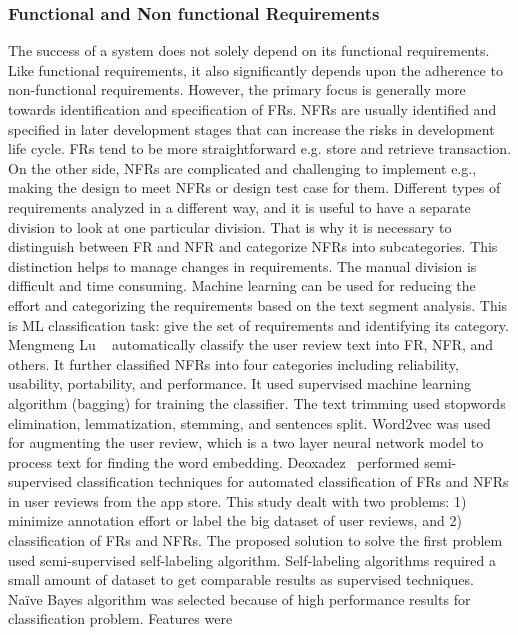 \subsubsection{Functional and Non functional Requirements}
The success of a system does not solely depend on its functional requirements.
Like functional requirements, it also significantly depends upon the adherence
to non-functional requirements. However, the primary focus is generally more
towards identification and specification of FRs. NFRs are usually identified and
specified in later development stages that can increase the risks in development
life cycle. FRs tend to be more straightforward e.g. store and retrieve
transaction. On the other side, NFRs are complicated and challenging to
implement e.g., making the design to meet NFRs or design test case for them.
Different types of requirements analyzed in a different way, and it is useful to
have a separate division to look at one particular division. That is why it is
necessary to distinguish between FR and NFR and categorize NFRs into
subcategories. This distinction helps to manage changes in requirements. The
manual division is difficult and time consuming. Machine learning can be used
for reducing the effort and categorizing the requirements based on the text
segment analysis. This is ML classification task: give the set of requirements
and identifying its category.\\
Mengmeng Lu \etal~ \cite{Lu:2017} automatically classify the user review text
into FR, NFR, and others. It further classified NFRs into four categories
including reliability, usability, portability, and performance. It used
supervised machine learning algorithm (bagging) for training the classifier. The
text trimming used stopwords elimination, lemmatization, stemming, and sentences
split. Word2vec was used for augmenting the user review, which is a two layer
neural network model to process text for finding the word embedding. Deoxadez
\etal~\cite{Deocadez:2017}performed semi-supervised classification techniques
for automated classification of FRs and NFRs in user reviews from the app store.
This study dealt with two problems: 1) minimize annotation effort or label the
big dataset of user reviews, and 2) classification of FRs and NFRs. The proposed
solution to solve the first problem used semi-supervised self-labeling
algorithm. Self-labeling algorithms required a small amount of dataset to get
comparable results as supervised techniques. Naïve Bayes algorithm was selected
because of high performance results for classification problem. Features were
